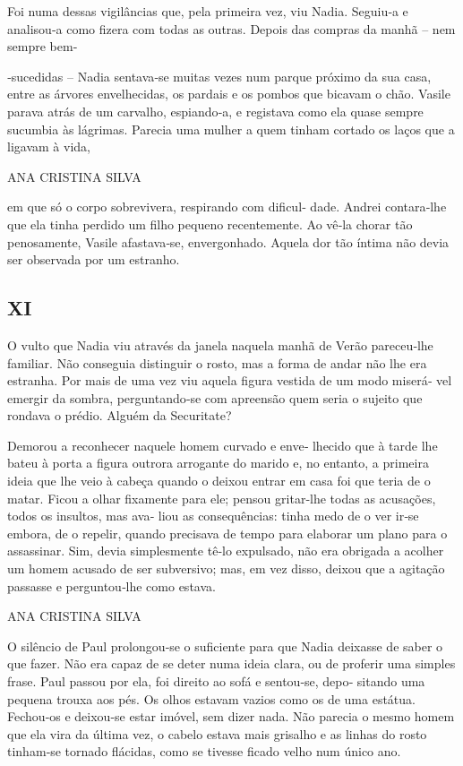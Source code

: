 Foi numa dessas vigilâncias que, pela primeira vez, viu Nadia. Seguiu‑a
e analisou‑a como fizera com todas as outras. Depois das compras da
manhã -- nem sempre bem‑

‑sucedidas -- Nadia sentava‑se muitas vezes num parque próximo da sua
casa, entre as árvores envelhecidas, os pardais e os pombos que bicavam
o chão. Vasile parava atrás de um carvalho, espiando‑a, e registava como
ela quase sempre sucumbia às lágrimas. Parecia uma mulher a quem tinham
cortado os laços que a ligavam à vida,

ANA CRISTINA SILVA

em que só o corpo sobrevivera, respirando com dificul‑ dade. Andrei
contara‑lhe que ela tinha perdido um filho pequeno recentemente. Ao
vê‑la chorar tão penosamente, Vasile afastava‑se, envergonhado. Aquela
dor tão íntima não devia ser observada por um estranho.


\subsection{XI}

O vulto que Nadia viu através da janela naquela manhã de Verão
pareceu‑lhe familiar. Não conseguia distinguir o rosto, mas a forma de
andar não lhe era estranha. Por mais de uma vez viu aquela figura
vestida de um modo miserá‑ vel emergir da sombra, perguntando‑se com
apreensão quem seria o sujeito que rondava o prédio. Alguém da
Securitate?

Demorou a reconhecer naquele homem curvado e enve‑ lhecido que à tarde
lhe bateu à porta a figura outrora arrogante do marido e, no entanto, a
primeira ideia que lhe veio à cabeça quando o deixou entrar em casa foi
que teria de o matar. Ficou a olhar fixamente para ele; pensou
gritar‑lhe todas as acusações, todos os insultos, mas ava‑ liou as
consequências: tinha medo de o ver ir‑se embora, de o repelir, quando
precisava de tempo para elaborar um plano para o assassinar. Sim, devia
simplesmente tê‑lo expulsado, não era obrigada a acolher um homem
acusado de ser subversivo; mas, em vez disso, deixou que a agitação
passasse e perguntou‑lhe como estava.

ANA CRISTINA SILVA

O silêncio de Paul prolongou‑se o suficiente para que Nadia deixasse de
saber o que fazer. Não era capaz de se deter numa ideia clara, ou de
proferir uma simples frase. Paul passou por ela, foi direito ao sofá e
sentou‑se, depo‑ sitando uma pequena trouxa aos pés. Os olhos estavam
vazios como os de uma estátua. Fechou‑os e deixou‑se estar imóvel, sem
dizer nada. Não parecia o mesmo homem que ela vira da última vez, o
cabelo estava mais grisalho e as linhas do rosto tinham‑se tornado
flácidas, como se tivesse ficado velho num único ano.

